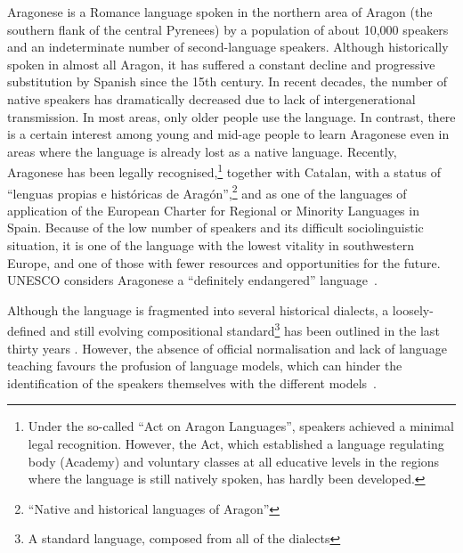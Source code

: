 \documentclass[10pt, a4paper]{article}
\begin{document}
  Aragonese is a Romance language spoken in the northern area of Aragon (the southern flank of the central Pyrenees) by a population of about 10,000 speakers and an indeterminate number of second-language speakers. 
  Although historically spoken in almost all Aragon, it has suffered a constant decline and progressive substitution by Spanish since the 15th century. 
  In recent decades, the number of native speakers has dramatically decreased due to lack of intergenerational transmission. 
  In most areas, only older people use the language. 
  In contrast, there is a certain interest among young and mid-age people to learn Aragonese even in areas where the language is already lost as a native language. Recently, Aragonese has been legally recognised,\footnote{Under the so-called ``Act on Aragon Languages'', speakers achieved a minimal legal recognition. However, the Act, which established a language regulating body (Academy) and voluntary classes at all educative levels in the regions where the language is still natively spoken, has hardly been developed.} together with Catalan, with a status of ``lenguas propias e históricas de Aragón'',\footnote{``Native and historical languages of Aragon''} and as one of the languages of application of the European Charter for Regional or Minority Languages in Spain. 
  Because of the low number of speakers and its difficult sociolinguistic situation, it is one of the language with the lowest vitality in southwestern Europe, and one of those with fewer resources and opportunities for the future. 
  UNESCO considers Aragonese a ``definitely endangered'' language~\cite{UNESCO}.








  Although the language is fragmented into several historical dialects, a loosely-defined and still evolving compositional standard\footnote{A standard language, composed from all of the dialects} has been outlined in the last thirty years \cite{Berceo,Metzeltin,EFA}. However, the absence of official normalisation and lack of language teaching favours the profusion of language models, which can hinder the identification of the speakers themselves with the different models~\cite{Paricio}. %
\end{document}
